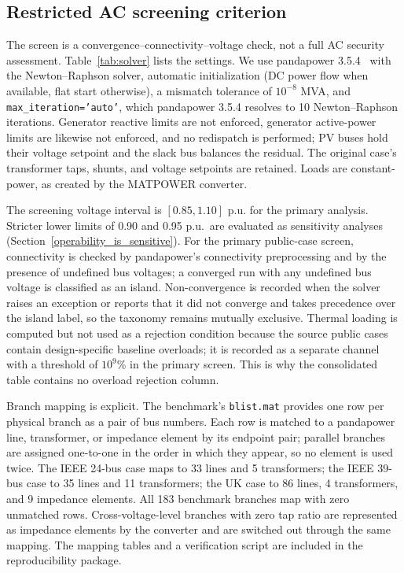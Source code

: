\subsection{Restricted AC screening criterion}\label{restricted_ac_screen}

The screen is a convergence--connectivity--voltage check, not a full AC security assessment. Table~\ref{tab:solver} lists the settings. We use pandapower 3.5.4~\citep{thurner2018} with the Newton--Raphson solver, automatic initialization (DC power flow when available, flat start otherwise), a mismatch tolerance of $10^{-8}$ MVA, and \texttt{max\_iteration='auto'}, which pandapower 3.5.4 resolves to 10 Newton--Raphson iterations. Generator reactive limits are not enforced, generator active-power limits are likewise not enforced, and no redispatch is performed; PV buses hold their voltage setpoint and the slack bus balances the residual. The original case's transformer taps, shunts, and voltage setpoints are retained. Loads are constant-power, as created by the MATPOWER converter.

The screening voltage interval is $[0.85,1.10]$ p.u. for the primary analysis. Stricter lower limits of 0.90 and 0.95 p.u.\ are evaluated as sensitivity analyses (Section~\ref{operability_is_sensitive}). For the primary public-case screen, connectivity is checked by pandapower's connectivity preprocessing and by the presence of undefined bus voltages; a converged run with any undefined bus voltage is classified as an island. Non-convergence is recorded when the solver raises an exception or reports that it did not converge and takes precedence over the island label, so the taxonomy remains mutually exclusive. Thermal loading is computed but not used as a rejection condition because the source public cases contain design-specific baseline overloads; it is recorded as a separate channel with a threshold of $10^{9}$\% in the primary screen. This is why the consolidated table contains no overload rejection column.

Branch mapping is explicit. The benchmark's \texttt{blist.mat} provides one row per physical branch as a pair of bus numbers. Each row is matched to a pandapower line, transformer, or impedance element by its endpoint pair; parallel branches are assigned one-to-one in the order in which they appear, so no element is used twice. The IEEE 24-bus case maps to 33 lines and 5 transformers; the IEEE 39-bus case to 35 lines and 11 transformers; the UK case to 86 lines, 4 transformers, and 9 impedance elements. All 183 benchmark branches map with zero unmatched rows. Cross-voltage-level branches with zero tap ratio are represented as impedance elements by the converter and are switched out through the same mapping. The mapping tables and a verification script are included in the reproducibility package.

